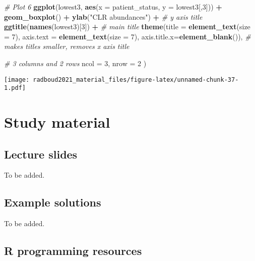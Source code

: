\documentclass[
  oneside]{book}
\newenvironment{Shaded}{\begin{snugshade}}{\end{snugshade}}
\newcommand{\CommentTok}[1]{\textcolor[rgb]{0.56,0.35,0.01}{\textit{#1}}}
\newcommand{\DataTypeTok}[1]{\textcolor[rgb]{0.13,0.29,0.53}{#1}}
\newcommand{\DecValTok}[1]{\textcolor[rgb]{0.00,0.00,0.81}{#1}}
\newcommand{\KeywordTok}[1]{\textcolor[rgb]{0.13,0.29,0.53}{\textbf{#1}}}
\newcommand{\NormalTok}[1]{#1}
\newcommand{\OperatorTok}[1]{\textcolor[rgb]{0.81,0.36,0.00}{\textbf{#1}}}
\newcommand{\StringTok}[1]{\textcolor[rgb]{0.31,0.60,0.02}{#1}}
\begin{document}
\begin{Shaded}
\begin{Highlighting}[]
  \CommentTok{# Plot 6}
  \KeywordTok{ggplot}\NormalTok{(lowest3, }\KeywordTok{aes}\NormalTok{(}\DataTypeTok{x =}\NormalTok{ patient_status, }\DataTypeTok{y =}\NormalTok{ lowest3[,}\DecValTok{3}\NormalTok{])) }\OperatorTok{+}\StringTok{ }
\StringTok{    }\KeywordTok{geom_boxplot}\NormalTok{() }\OperatorTok{+}\StringTok{ }
\StringTok{    }\KeywordTok{ylab}\NormalTok{(}\StringTok{"CLR abundances"}\NormalTok{) }\OperatorTok{+}\StringTok{ }\CommentTok{# y axis title}
\StringTok{    }\KeywordTok{ggtitle}\NormalTok{(}\KeywordTok{names}\NormalTok{(lowest3)[}\DecValTok{3}\NormalTok{]) }\OperatorTok{+}\StringTok{ }\CommentTok{# main title}
\StringTok{    }\KeywordTok{theme}\NormalTok{(}\DataTypeTok{title =} \KeywordTok{element_text}\NormalTok{(}\DataTypeTok{size =} \DecValTok{7}\NormalTok{),}
          \DataTypeTok{axis.text =} \KeywordTok{element_text}\NormalTok{(}\DataTypeTok{size =} \DecValTok{7}\NormalTok{),}
          \DataTypeTok{axis.title.x=}\KeywordTok{element_blank}\NormalTok{()), }\CommentTok{# makes titles smaller, removes x axis title}
  
  \CommentTok{# 3 columns and 2 rows}
  \DataTypeTok{ncol =} \DecValTok{3}\NormalTok{, }
  \DataTypeTok{nrow =} \DecValTok{2}
\NormalTok{)}
\end{Highlighting}
\end{Shaded}

\texttt{[image: radboud2021\_material\_files/figure-latex/unnamed-chunk-37-1.pdf]}

\hypertarget{study-material}{%
\chapter{Study material}\label{study-material}}

\hypertarget{lecture-slides}{%
\section{Lecture slides}\label{lecture-slides}}

To be added.

\hypertarget{example-solutions}{%
\section{Example solutions}\label{example-solutions}}

To be added.

\hypertarget{r-programming-resources}{%
\section{R programming resources}\label{r-programming-resources}}
\end{document}
